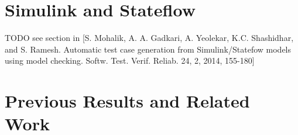 \section{Simulink and Stateflow}

TODO see section in [S. Mohalik, A. A. Gadkari, A. Yeolekar, K.C. Shashidhar, and S. Ramesh. Automatic test case generation from Simulink/Statefow models using model checking. Softw. Test. Verif. Reliab. 24, 2, 2014, 155-180]

\section{Previous Results and Related Work}
%
